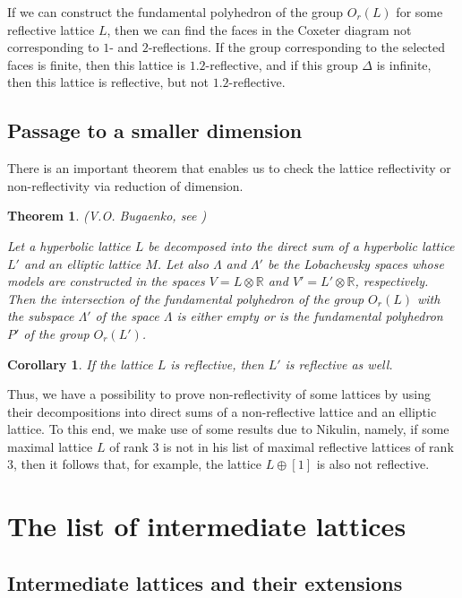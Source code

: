 \documentclass[14pt]{article}
\newtheorem{theorem}{\indent Theorem}[section]
\newtheorem{corollary}{\indent Corollary}[theorem]
\begin{document}
If we can construct the fundamental polyhedron of the group $O_r (L)$
for some reflective
lattice $L$, then we can find the faces in the Coxeter diagram
 not corresponding to $1$- and
$2$-reflections. If the group corresponding to the selected faces is finite,
then this lattice
is  $1.2$-reflective,
and if this group $\Delta$ is infinite,
 then this lattice is reflective, but not $1.2$-reflective.

\subsection{Passage to a smaller dimension}

There is an important theorem
that enables us to check the lattice reflectivity or non-reflectivity
via reduction of dimension.

\begin{theorem}\label{bugaenko}
(V.O. Bugaenko, see \cite[Theorem 2.1]{bugaenko92arcrgr-refl})

Let a hyperbolic lattice $L$ be decomposed into
the direct sum of a hyperbolic lattice $L'$ and
an elliptic lattice $M$. Let also $\Lambda$ and $\Lambda'$ be the Lobachevsky spaces
whose models are constructed in the spaces $V
= L \otimes \mathbb{R}$ and $V' = L' \otimes
\mathbb{R}$, respectively. Then the intersection of the fundamental
polyhedron of the group $O_r(L)$ with the subspace $\Lambda'$ of the
space $\Lambda$ is either empty or
is the fundamental polyhedron $P'$ of the group $O_r (L')$.
\end{theorem}

\begin{corollary}
If the lattice $L$ is reflective, then $L'$ is reflective as well.
\end{corollary}

Thus, we have a possibility to prove non-reflectivity of some lattices
by using their
decompositions into direct sums of a non-reflective lattice and an elliptic lattice.
To this end, we make  use of some results due to  Nikulin, namely,
if some maximal lattice $L$ of rank $3$
is not in his list of maximal reflective lattices of rank $3$, then
it follows that, for example, the  lattice $L \oplus [1]$
is  also not reflective.

\section{The list of intermediate lattices}\label{sp-prom}

\subsection{Intermediate lattices and their extensions}
\end{document}
